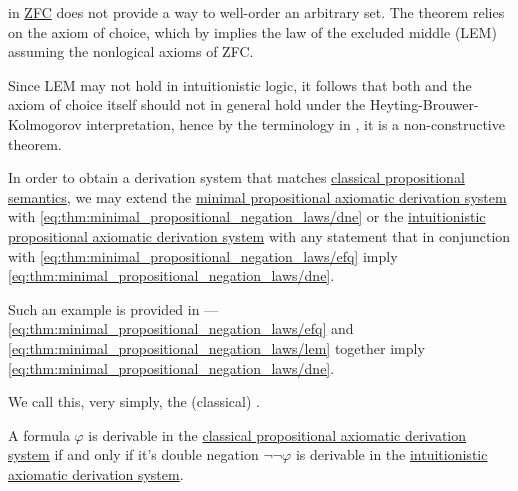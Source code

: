 \begin{example}\label{ex:def:brouwer_heyting_kolmogorov_interpretation/well_ordering_principle_zfc}
   in \hyperref[def:set_zfc]{ZFC} does not provide a way to well-order an arbitrary set. The theorem relies on the axiom of choice, which by  implies the law of the excluded middle (LEM) assuming the nonlogical axioms of ZFC.

  Since LEM may not hold in intuitionistic logic, it follows that both  and the axiom of choice itself should not in general hold under the Heyting-Brouwer-Kolmogorov interpretation, hence by the terminology in , it is a non-constructive theorem.
\end{example}

\begin{definition}\label{def:propositional_axiomatic_derivation_system}
  In order to obtain a derivation system that matches \hyperref[def:propositional_semantics]{classical propositional semantics}, we may extend the \hyperref[def:minimal_propositional_axiomatic_derivation_system]{minimal propositional axiomatic derivation system} with \eqref{eq:thm:minimal_propositional_negation_laws/dne} or the \hyperref[def:intuitionistic_propositional_axiomatic_derivation_system]{intuitionistic propositional axiomatic derivation system} with any statement that in conjunction with \eqref{eq:thm:minimal_propositional_negation_laws/efq} imply \eqref{eq:thm:minimal_propositional_negation_laws/dne}.

  Such an example is provided in  --- \eqref{eq:thm:minimal_propositional_negation_laws/efq} and \eqref{eq:thm:minimal_propositional_negation_laws/lem} together imply \eqref{eq:thm:minimal_propositional_negation_laws/dne}.

  We call this, very simply, the (classical) .
\end{definition}

\begin{theorem}\label{thm:glivenkos_double_negation_theorem}
  A formula \( \varphi \) is derivable in the \hyperref[def:propositional_axiomatic_derivation_system]{classical propositional axiomatic derivation system} if and only if it's double negation \( \neg \neg \varphi \) is derivable in the \hyperref[def:intuitionistic_propositional_axiomatic_derivation_system]{intuitionistic axiomatic derivation system}.
\end{theorem}

